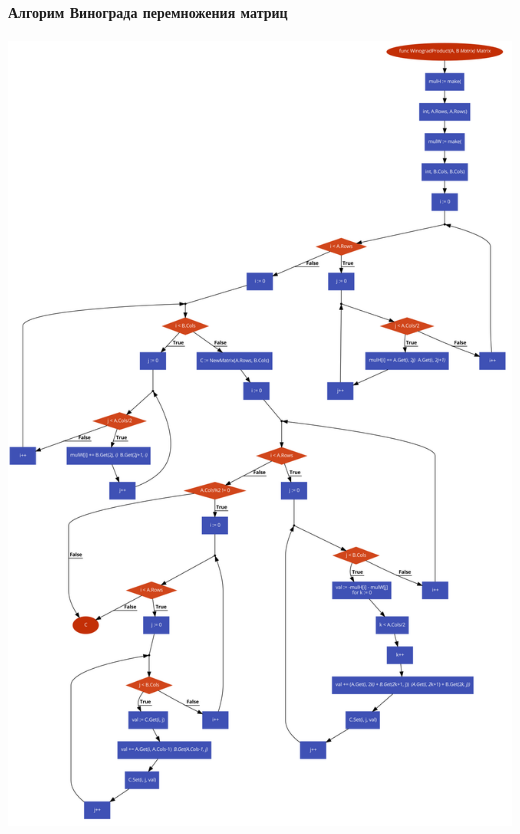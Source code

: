 \documentclass[utf8x, 12pt]{G7-32} %
\begin{document}
\paragraph{Алгорим Винограда перемножения матриц}
\begin{center}
	\includegraphics[scale=0.3]{images/matrixWinograd.png}
\end{center}

\newpage
\end{document}
